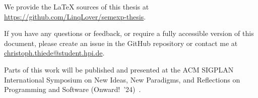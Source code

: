 
\noindent
\begingroup
	We provide the \LaTeX{} sources of this thesis at \url{https://github.com/LinqLover/semexp-thesis}. %

	If you have any questions or feedback, or require a fully accessible version of this document, please create an issue in the GitHub repository or contact me at \href{mailto:christoph.thiede@student.hpi.de}{christoph.\allowbreak thiede@\allowbreak student.hpi.de}.

	\ParSep

	Parts of this work will be published and presented at the ACM SIGPLAN International Symposium on New Ideas, New Pa\-ra\-digms, and Reflections on Programming and Software (Onward!~'24)~\cite{thiede2024talking}.
\endgroup
